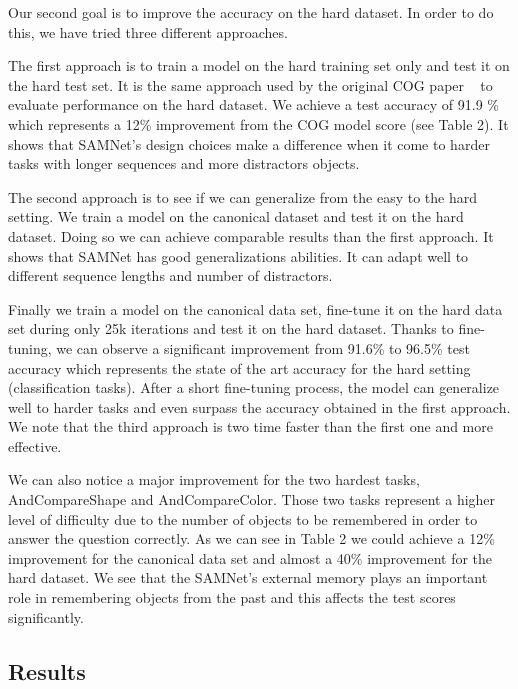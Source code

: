 Our second goal is to improve the accuracy on the hard dataset. In order to do this, we have tried three different approaches.

The first approach is to train a model on the hard training set only and test it on the hard test set. It is the same approach used by the original COG paper ~\cite{yang2018dataset} to evaluate performance on the hard dataset. We achieve a test accuracy of 91.9 \% which represents a 12\% improvement from the COG model score (see Table 2).
It shows that SAMNet's design choices make a difference when it come to harder tasks with longer sequences and more distractors objects.

The second approach is to see if we can generalize from the easy to the hard setting. We train a model on the canonical dataset and test it on the hard dataset. Doing so we can achieve comparable results than the first approach. It shows that SAMNet has good generalizations abilities. It can adapt well to different sequence lengths and number of distractors.

Finally we train a model on the canonical data set, fine-tune it on the hard data set during only 25k iterations and test it on the hard dataset. Thanks to fine-tuning, we can observe a significant improvement from 91.6\%  to 96.5\% test accuracy which represents the state of the art accuracy for the hard setting (classification tasks).
After a short fine-tuning process, the model can generalize well to harder tasks and even surpass the accuracy obtained in the first approach. We note that the third approach is two time faster than the first one and more effective.


We can also notice a major improvement for the two hardest tasks, AndCompareShape and AndCompareColor. Those two tasks represent a higher level of difficulty due to the number of objects to be remembered in order to answer the question correctly.
As we can see in Table 2 we could achieve a 12\% improvement for the canonical data set and almost a 40\% improvement for the hard dataset.
We see that the SAMNet's external memory plays an important role in remembering objects from the past and this affects the test scores significantly. 

\subsection{Results}

